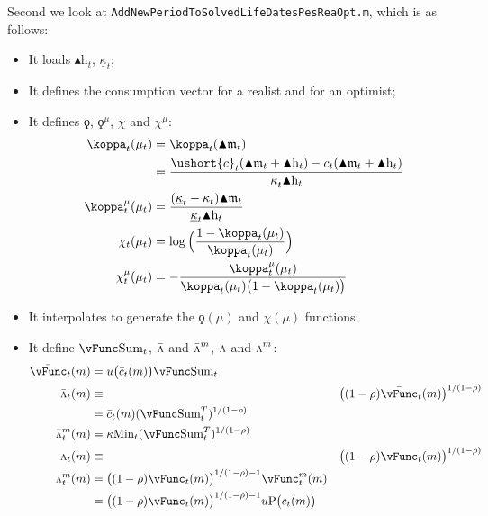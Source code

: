 \documentclass[titlepage,abstract]{\econtex}
\providecommand{\kappaMin}{\kappa\text{Min}}
\providecommand{\vSum}{\vFunc\text{Sum}}
\providecommand{\Deltah}{\blacktriangle \mathrm{h}}
\providecommand{\Deltam}{\blacktriangle \mathfrak{m}}
\providecommand{\vInv}{\ensuremath{\scriptstyle \Lambda \displaystyle}}
\begin{document}
Second we look at \texttt{AddNewPeriodToSolvedLifeDatesPesReaOpt.m}, which is as follows:
        \begin{itemize}
        \item It loads $\Deltah_{t}$, $\underline{\kappa}_{t}$;
        \item It defines the consumption vector for a realist and for an optimist;
        \item It defines $\ensuremath{\koppa}$, $\ensuremath{\koppa}^{\mu}$, $\chi$ and $\chi^{\mu}$:
            \begin{equation}\begin{gathered}\begin{aligned}
            \koppa_{t} (\mu_{t})  & =  \koppa_{t} (\Deltam_{t}) \\
             & =  \frac{\ushort{c}_{t}(\Deltam_{t} + \Deltah_{t})-c_{t}(\Deltam_{t} + \Deltah _{t})}{\underline{\kappa}_{t} \Deltah_{t}} \\
            \koppa_{t}^{\mu} (\mu_{t})  & =  \frac{(\underline{\kappa}_{t}-\kappa_{t}) \Deltam_{t}}{\underline{\kappa}_{t} \Deltah_{t}} \\
            \chi_{t} (\mu_{t})  & =  \log\Big(\frac{1-\koppa_{t} (\mu_{t})}{\koppa_{t} (\mu_{t}) }\Big) \\
            \chi_{t}^{\mu} (\mu_{t})  & =  -\frac{\koppa_{t}^{\mu}(\mu_{t})}{\koppa_{t} (\mu_{t})\big(1-\koppa_{t} (\mu_{t})\big)}
            \end{aligned}\end{gathered}\end{equation}
        \item It interpolates to generate the $\ensuremath{\koppa}(\mu)$ and $\chi(\mu)$ functions;
        \item It define $\vSum_{t}$, $\bar{\vInv}$ and $\bar{\vInv}^{m}$, $\vInv$ and $\vInv^{m}$:
            \begin{equation}\begin{gathered}\begin{aligned}
            \bar{\vFunc}_{t} (m)  & =  u\big(\bar{c}_{t}(m)\big) \vSum_{t} \\
            \bar{\vInv}_{t} (m) &\equiv&
            \big((1-\rho)\bar{\vFunc}_{t} (m)\big)^{1/(1-\rho)} \\
             & = \bar{c}_{t}(m) (\vSum_{t}^{T})^{1/(1-\rho)} \\
            \bar{\vInv}_{t}^{m} (m)  & = 
            \kappaMin_{t} (\vSum_{t}^{T})^{1/(1-\rho)} \\
            \vInv_{t} (m) &\equiv&
            \big((1-\rho)\vFunc_{t} (m)\big)^{1/(1-\rho)} \\
            \vInv_{t}^{m} (m)  & = 
            \big((1-\rho)\vFunc_{t} (m)\big)^{1/(1-\rho)-1} \vFunc_{t}^{m} (m)\\
             & = 
            \big((1-\rho)\vFunc_{t} (m)\big)^{1/(1-\rho)-1} u\text{P}\big(c_{t}(m)\big) \\
            \end{aligned}\end{gathered}\end{equation}


\end{itemize}
\end{document}
